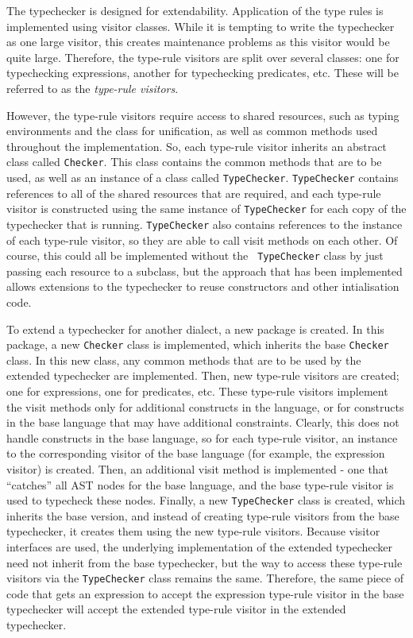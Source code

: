 \documentclass{llncs}
\begin{document}
The typechecker is designed for extendability. Application of the type
rules is implemented using visitor classes. While it is tempting to
write the typechecker as one large visitor, this creates maintenance
problems as this visitor would be quite large. Therefore, the
type-rule visitors are split over several classes: one for
typechecking expressions, another for typechecking predicates,
etc. These will be referred to as the {\em type-rule visitors}.

However, the type-rule visitors require access to shared resources,
such as typing environments and the class for unification, as well as
common methods used throughout the implementation. So, each type-rule
visitor inherits an abstract class called {\tt Checker}. This class
contains the common methods that are to be used, as well as an
instance of a class called {\tt TypeChecker}. {\tt TypeChecker}
contains references to all of the shared resources that are required,
and each type-rule visitor is constructed using the same instance of
{\tt TypeChecker} for each copy of the typechecker that is
running. {\tt TypeChecker} also contains references to the instance of
each type-rule visitor, so they are able to call visit methods on each
other. Of course, this could all be implemented without the {\tt
TypeChecker} class by just passing each resource to a subclass, but
the approach that has been implemented allows extensions to the
typechecker to reuse constructors and other intialisation code.

To extend a typechecker for another dialect, a new package is created.
In this package, a new {\tt Checker} class is implemented, which
inherits the base {\tt Checker} class. In this new class, any common
methods that are to be used by the extended typechecker are
implemented. Then, new type-rule visitors are created; one for
expressions, one for predicates, etc.  These type-rule visitors
implement the visit methods only for additional constructs in the
language, or for constructs in the base language that may have
additional constraints. Clearly, this does not handle constructs in
the base language, so for each type-rule visitor, an instance to the
corresponding visitor of the base language (for example, the
expression visitor) is created. Then, an additional visit method is
implemented - one that ``catches'' all AST nodes for the base
language, and the base type-rule visitor is used to typecheck these
nodes. Finally, a new {\tt TypeChecker} class is created, which
inherits the base version, and instead of creating type-rule visitors
from the base typechecker, it creates them using the new type-rule
visitors. Because visitor interfaces are used, the underlying
implementation of the extended typechecker need not inherit from the
base typechecker, but the way to access these type-rule visitors via
the {\tt TypeChecker} class remains the same. Therefore, the same
piece of code that gets an expression to accept the expression
type-rule visitor in the base typechecker will accept the extended
type-rule visitor in the extended typechecker.
\end{document}
